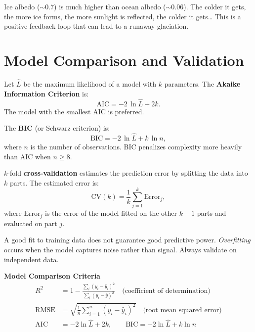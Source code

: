 \begin{intuition}
Ice albedo ($\sim 0.7$) is much higher than ocean albedo ($\sim 0.06$).
The colder it gets, the more ice forms, the more sunlight is reflected,
the colder it gets\ldots{} This is a positive feedback loop that can
lead to a runaway glaciation.
\end{intuition}

\section{Model Comparison and Validation}
\label{sec:validation}

\begin{definition}
Let $\hat{L}$ be the maximum likelihood of a model with $k$ parameters.
The \textbf{Akaike Information Criterion} is:
\[
  \text{AIC} = -2\,\ln\hat{L} + 2k.
\]
The model with the smallest AIC is preferred.
\end{definition}

\begin{definition}
The \textbf{BIC} (or Schwarz criterion) is:
\[
  \text{BIC} = -2\,\ln\hat{L} + k\,\ln n,
\]
where $n$ is the number of observations. BIC penalizes complexity more
heavily than AIC when $n \geq 8$.
\end{definition}

\begin{proposition}
$k$-fold \textbf{cross-validation} estimates the prediction error by
splitting the data into $k$ parts. The estimated error is:
\[
  \text{CV}(k) = \frac{1}{k}\sum_{j=1}^k \text{Error}_j,
\]
where $\text{Error}_j$ is the error of the model fitted on the other
$k-1$ parts and evaluated on part $j$.
\end{proposition}

\begin{attention}
A good fit to training data does not guarantee good predictive power.
\emph{Overfitting} occurs when the model captures noise
rather than signal. Always validate on independent data.
\end{attention}

\begin{keyformulas}
\textbf{Model Comparison Criteria}
\begin{align*}
  R^2 &= 1 - \frac{\sum_i (y_i - \hat{y}_i)^2}{\sum_i (y_i - \bar{y})^2}
    \quad \text{(coefficient of determination)} \\[4pt]
  \text{RMSE} &= \sqrt{\frac{1}{n}\sum_{i=1}^n (y_i - \hat{y}_i)^2}
    \quad \text{(root mean squared error)} \\[4pt]
  \text{AIC} &= -2\ln\hat{L} + 2k, \qquad
  \text{BIC} = -2\ln\hat{L} + k\ln n
\end{align*}
\end{keyformulas}

